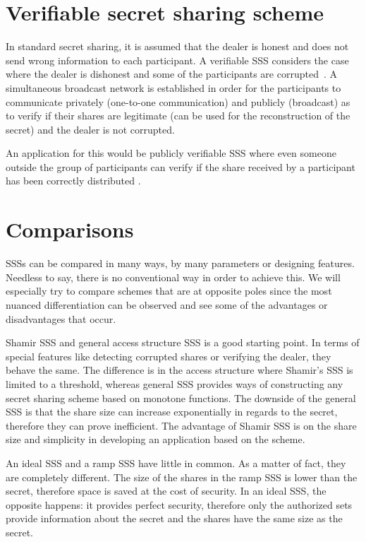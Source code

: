 \documentclass[12pt, a4paper, oneside]{book}
\begin{document}
    \section{Verifiable secret sharing scheme}
    In standard secret sharing, it is assumed that the dealer is honest and does not send wrong information to each participant. A verifiable SSS considers the case where the dealer is dishonest and some of the participants are corrupted~\cite{1985VerifiableGoldW}. 
    A simultaneous broadcast network is established in order for the participants to communicate privately (one-to-one communication) and publicly (broadcast) as to verify if their shares are legitimate (can be used for the reconstruction of the secret) and the dealer is not corrupted. 
    
    An application for this would be publicly verifiable SSS where even someone outside the group of participants can verify if the share received by a participant has been correctly distributed \cite{PracticalPublicVer}.
    \section{Comparisons}
    SSSs can be compared in many ways, by many parameters or designing features. Needless to say, there is no conventional way in order to achieve this. We will especially try to compare schemes that are at opposite poles since the most nuanced differentiation can be observed and see some of the advantages or disadvantages that occur.
    
    Shamir SSS and general access structure SSS is a good starting point. In terms of special features like detecting corrupted shares or verifying the dealer, they behave the same. The difference is in the access structure where Shamir's SSS is limited to a threshold, whereas general SSS provides ways of constructing any secret sharing scheme based on monotone functions. The downside of the general SSS is that the share size can increase exponentially in regards to the secret, therefore they can prove inefficient. The advantage of Shamir SSS is on the share size and simplicity in developing an application based on the scheme. 
    
    An ideal SSS and a ramp SSS have little in common. As a matter of fact, they are completely different. The size of the shares in the ramp SSS is lower than the secret, therefore space is saved at the cost of security. In an ideal SSS, the opposite happens: it provides perfect security, therefore only the authorized sets provide information about the secret and the shares have the same size as the secret.
    
\end{document}
